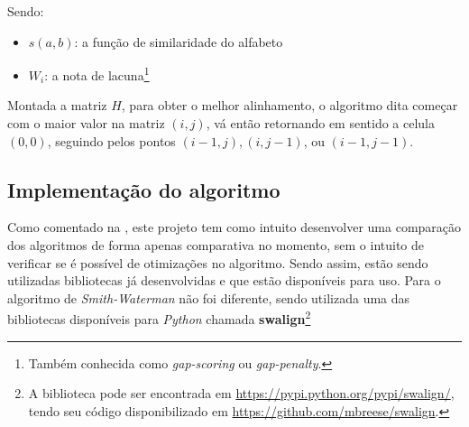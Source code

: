 Sendo:
\begin{itemize}
	\item $s(a,b)$: a função de similaridade do alfabeto
	\item $W_i$: a nota de lacuna\footnote{Também conhecida como \textit{gap-scoring} ou \textit{gap-penalty}.}
\end{itemize}

Montada a matriz $H$, para obter o melhor alinhamento, o algoritmo dita começar com o maior valor na matriz $(i,j)$, vá então retornando em sentido a celula $(0,0)$, seguindo pelos pontos $(i - 1,j), (i, j - 1)$, ou $(i - 1, j - 1)$.

\subsection{Implementação do algoritmo} %
\label{sub:implementa_o_do_algoritmo}

Como comentado na , este projeto tem como intuito desenvolver uma comparação dos algoritmos de forma apenas comparativa no momento, sem o intuito de verificar se é possível de otimizações no algoritmo. Sendo assim, estão sendo utilizadas bibliotecas já desenvolvidas e que estão  disponíveis para uso. Para o algoritmo de \textit{Smith-Waterman} não foi diferente, sendo utilizada uma das bibliotecas disponíveis para \textit{Python} chamada \textbf{swalign}\footnote{A biblioteca pode ser encontrada em \url{https://pypi.python.org/pypi/swalign/}, tendo seu código disponibilizado em \url{https://github.com/mbreese/swalign}.}


